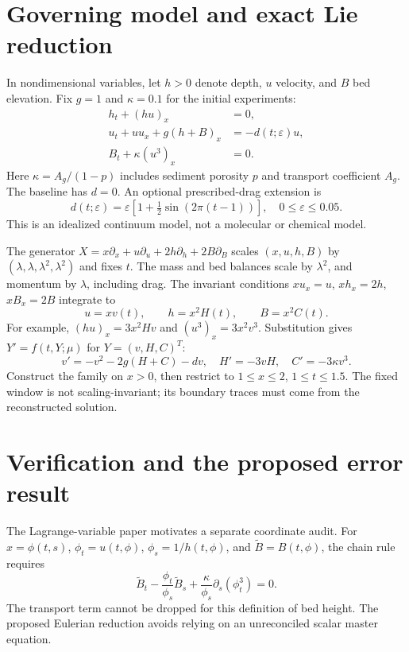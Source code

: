 \documentclass[12pt,a4paper]{article}
\begin{document}
\section{Governing model and exact Lie reduction}
In nondimensional variables, let $h>0$ denote depth, $u$ velocity, and $B$ bed elevation. Fix $g=1$ and $\kappa=0.1$ for the initial experiments:
\begin{equation}\begin{aligned}
h_t+(hu)_x&=0,\\
u_t+uu_x+g(h+B)_x&=-d(t;\varepsilon)u,\\
B_t+\kappa(u^3)_x&=0.
\end{aligned}\label{pde}\end{equation}
Here $\kappa=A_g/(1-p)$ includes sediment porosity $p$ and transport coefficient $A_g$. The baseline has $d=0$. An optional prescribed-drag extension is
\[
d(t;\varepsilon)=\varepsilon[1+\tfrac12\sin(2\pi(t-1))],\quad 0\leq\varepsilon\leq0.05.
\]
This is an idealized continuum model, not a molecular or chemical model.

The generator $X=x\partial_x+u\partial_u+2h\partial_h+2B\partial_B$ scales $(x,u,h,B)$ by $(\lambda,\lambda,\lambda^2,\lambda^2)$ and fixes $t$. The mass and bed balances scale by $\lambda^2$, and momentum by $\lambda$, including drag. The invariant conditions $xu_x=u$, $xh_x=2h$, $xB_x=2B$ integrate to
\[
u=xv(t),\qquad h=x^2H(t),\qquad B=x^2C(t).
\]
For example, $(hu)_x=3x^2Hv$ and $(u^3)_x=3x^2v^3$. Substitution gives $Y'=f(t,Y;\mu)$ for $Y=(v,H,C)^T$:
\begin{equation}
v'=-v^2-2g(H+C)-dv,\quad H'=-3vH,\quad C'=-3\kappa v^3.\label{ode}
\end{equation}
Construct the family on $x>0$, then restrict to $1\leq x\leq2$, $1\leq t\leq1.5$. The fixed window is not scaling-invariant; its boundary traces must come from the reconstructed solution.
\newpage
\section{Verification and the proposed error result}
The Lagrange-variable paper \cite{sve} motivates a separate coordinate audit. For $x=\phi(t,s)$, $\phi_t=u(t,\phi)$, $\phi_s=1/h(t,\phi)$, and $\widetilde B=B(t,\phi)$, the chain rule requires
\[
\widetilde B_t-\frac{\phi_t}{\phi_s}\widetilde B_s
 +\frac{\kappa}{\phi_s}\partial_s(\phi_t^3)=0.
\]
The transport term cannot be dropped for this definition of bed height. The proposed Eulerian reduction avoids relying on an unreconciled scalar master equation.
\end{document}
